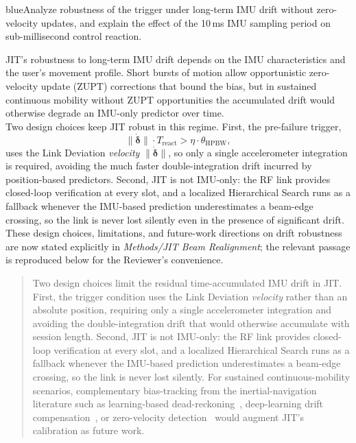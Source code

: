 \documentclass{article}
\newcommand{\blue}[1]{\begin{color}{blue}#1\end{color}}
\begin{document}
\begin{tcbremark}
{\selectfont
\blue{Analyze robustness of the trigger under long-term IMU drift without zero-velocity updates, and explain the effect of the 10\,ms IMU sampling period on sub-millisecond control reaction.}
}
\end{tcbremark}

\noindent JIT's robustness to long-term IMU drift depends on the IMU characteristics and the user's movement profile. Short bursts of motion allow opportunistic zero-velocity update (ZUPT) corrections that bound the bias, but in sustained continuous mobility without ZUPT opportunities the accumulated drift would otherwise degrade an IMU-only predictor over time.\\

\noindent Two design choices keep JIT robust in this regime. First, the pre-failure trigger,
\begin{equation}
    \|\dot{\boldsymbol{\delta}}\| \cdot T_{\text{react}} > \eta \cdot \theta_{\text{HPBW}}, \tag{Eq.~7}
\end{equation}
uses the Link Deviation \emph{velocity} $\|\dot{\boldsymbol{\delta}}\|$, so only a single accelerometer integration is required, avoiding the much faster double-integration drift incurred by position-based predictors. Second, JIT is not IMU-only: the RF link provides closed-loop verification at every slot, and a localized Hierarchical Search runs as a fallback whenever the IMU-based prediction underestimates a beam-edge crossing, so the link is never lost silently even in the presence of significant drift.\\

\noindent These design choices, limitations, and future-work directions on drift robustness are now stated explicitly in \emph{Methods/JIT Beam Realignment}; the relevant passage is reproduced below for the Reviewer's convenience.

\begin{quote}
{\color{cyan!75!black}
Two design choices limit the residual time-accumulated IMU drift in JIT. First, the trigger condition uses the Link Deviation \emph{velocity} rather than an absolute position, requiring only a single accelerometer integration and avoiding the double-integration drift that would otherwise accumulate with session length. Second, JIT is not IMU-only: the RF link provides closed-loop verification at every slot, and a localized Hierarchical Search runs as a fallback whenever the IMU-based prediction underestimates a beam-edge crossing, so the link is never lost silently. For sustained continuous-mobility scenarios, complementary bias-tracking from the inertial-navigation literature such as learning-based dead-reckoning~\cite{Brossard2020AIIMU}, deep-learning drift compensation~\cite{Chen2024DLInertial}, or zero-velocity detection~\cite{Skog2010ZUPT} would augment JIT's calibration as future work.
}
\end{quote}
\end{document}

